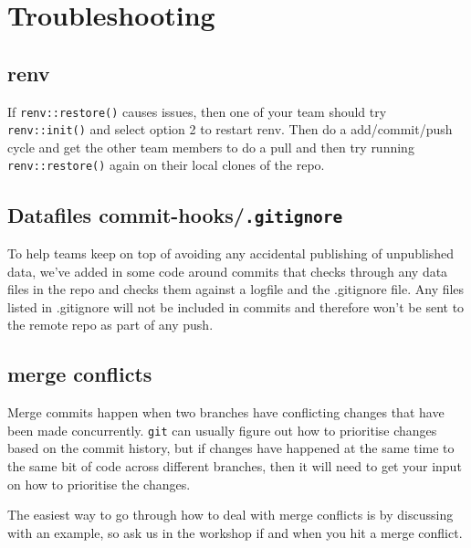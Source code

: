 \documentclass[
  12pt,
]{article}
\begin{document}
\newpage

\hypertarget{troubleshooting}{%
\section{Troubleshooting}\label{troubleshooting}}

\hypertarget{renv}{%
\subsection{renv}\label{renv}}

If \texttt{renv::restore()} causes issues, then one of your team should
try \texttt{renv::init()} and select option 2 to restart renv. Then do a
add/commit/push cycle and get the other team members to do a pull and
then try running \texttt{renv::restore()} again on their local clones of
the repo.

\hypertarget{datafiles-commit-hooks.gitignore}{%
\subsection{\texorpdfstring{Datafiles
commit-hooks/\texttt{.gitignore}}{Datafiles commit-hooks/.gitignore}}\label{datafiles-commit-hooks.gitignore}}

To help teams keep on top of avoiding any accidental publishing of
unpublished data, we've added in some code around commits that checks
through any data files in the repo and checks them against a logfile and
the .gitignore file. Any files listed in .gitignore will not be included
in commits and therefore won't be sent to the remote repo as part of any
push.

\hypertarget{merge-conflicts}{%
\subsection{merge conflicts}\label{merge-conflicts}}

Merge commits happen when two branches have conflicting changes that
have been made concurrently. \texttt{git} can usually figure out how to
prioritise changes based on the commit history, but if changes have
happened at the same time to the same bit of code across different
branches, then it will need to get your input on how to prioritise the
changes.

The easiest way to go through how to deal with merge conflicts is by
discussing with an example, so ask us in the workshop if and when you
hit a merge conflict.
\end{document}

